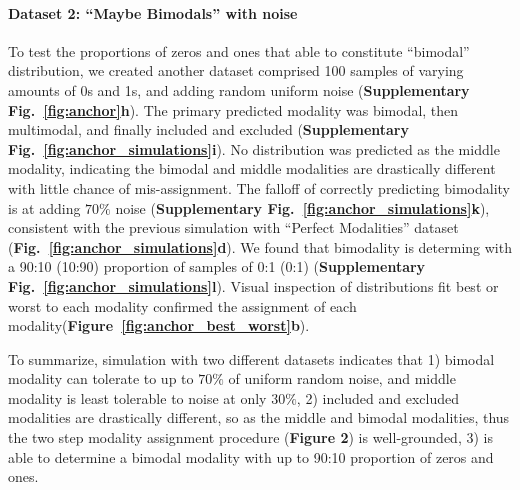 \paragraph{Dataset 2: ``Maybe Bimodals'' with noise}
\label{sec:anchor_maybe_bimodals}

To test the proportions of zeros and ones that able to constitute ``bimodal'' distribution, we created another dataset comprised 100 samples of varying amounts of 0s and 1s, and adding random uniform noise (\textbf{Supplementary Fig.~\ref{fig:anchor}h}). The primary predicted modality was bimodal, then multimodal, and finally included and excluded (\textbf{Supplementary Fig.~\ref{fig:anchor_simulations}i}). No distribution was predicted as the middle modality, indicating the bimodal and middle modalities are drastically different with little chance of mis-assignment. The falloff of correctly predicting bimodality is at adding $70\%$ noise (\textbf{Supplementary Fig.~\ref{fig:anchor_simulations}k}), consistent with the previous simulation with ``Perfect Modalities'' dataset (\textbf{Fig.~\ref{fig:anchor_simulations}d}). We found that bimodality is determing with a 90:10 (10:90) proportion of samples of 0:1 (0:1) (\textbf{Supplementary Fig.~\ref{fig:anchor_simulations}l}). Visual inspection of distributions fit best or worst to each modality confirmed the assignment of each modality(\textbf{Figure~\ref{fig:anchor_best_worst}b}).

To summarize, simulation with two different datasets indicates that 1) bimodal modality can tolerate to up to $70\%$ of uniform random noise, and middle modality is least tolerable to noise at only $30\%$, 2) included and excluded modalities are drastically different, so as the middle and bimodal modalities, thus the two step modality assignment procedure (\textbf{Figure 2}) is well-grounded, 3) \anchor is able to determine a bimodal modality with up to 90:10 proportion of zeros and ones.



